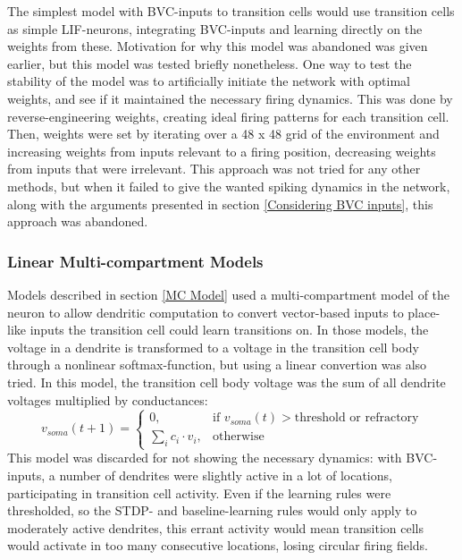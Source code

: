 \documentclass{article}
\begin{document}
    The simplest model with BVC-inputs to transition cells would use transition cells as simple LIF-neurons, integrating BVC-inputs and learning directly on the weights from these. Motivation for why this model was abandoned was given earlier, but this model was tested briefly nonetheless. One way to test the stability of the model was to artificially initiate the network with optimal weights, and see if it maintained the necessary firing dynamics. This was done by reverse-engineering weights, creating ideal firing patterns for each transition cell. Then, weights were set by iterating over a 48 x 48 grid of the environment and increasing weights from inputs relevant to a firing position, decreasing weights from inputs that were irrelevant. This approach was not tried for any other methods, but when it failed to give the wanted spiking dynamics in the network, along with the arguments presented in section \ref{Considering BVC inputs}, this approach was abandoned.

    \subsubsection{Linear Multi-compartment Models} \label{Lin MCModel}

    Models described in section \ref{MC Model} used a multi-compartment model of the neuron to allow dendritic computation to convert vector-based inputs to place-like inputs the transition cell could learn transitions on. In those models, the voltage in a dendrite is transformed to a voltage in the transition cell body through a nonlinear softmax-function, but using a linear convertion was also tried. In this model, the transition cell body voltage was the sum of all dendrite voltages multiplied by conductances: \begin{equation}\label{key8} v_{soma}(t + 1) = \begin{cases} 0, & \text{if } v_{soma}(t) > \text{threshold or refractory}\\
        \sum_{i}^{} c_i \cdot v_i, & \text{otherwise} \end{cases}\end{equation} 
    This model was discarded for not showing the necessary dynamics: with BVC-inputs, a number of dendrites were slightly active in a lot of locations, participating in transition cell activity. Even if the learning rules were thresholded, so the STDP- and baseline-learning rules would only apply to moderately active dendrites, this errant activity would mean transition cells would activate in too many consecutive locations, losing circular firing fields.
\end{document}
